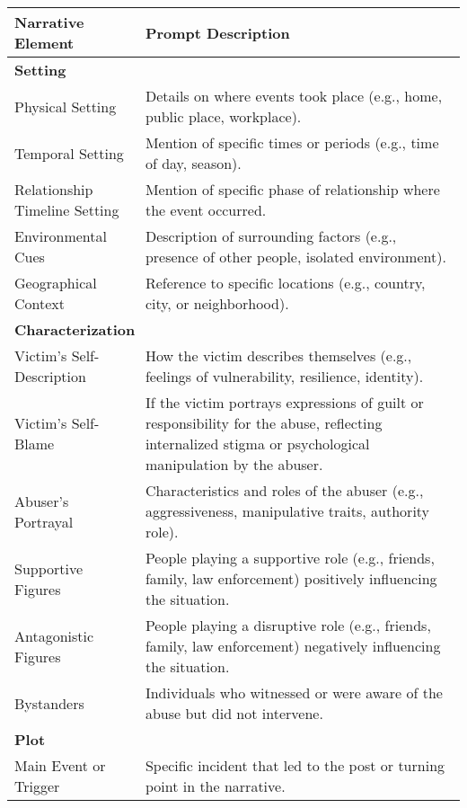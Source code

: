 \documentclass[11pt]{article}
\begin{document}
\begin{table}[ht]
    \centering
    \begin{tabular}{|p{4cm}|p{12cm}|}
        \hline
        \textbf{Narrative Element} & \textbf{Prompt Description} \\ \hline
        \multicolumn{2}{|l|}{\textbf{Setting}} \\ \hline
        Physical Setting & Details on where events took place (e.g., home, public place, workplace). \\ \hline
        Temporal Setting & Mention of specific times or periods (e.g., time of day, season). \\ \hline
        Relationship Timeline Setting & Mention of specific phase of relationship where the event occurred. \\ \hline
        Environmental Cues & Description of surrounding factors (e.g., presence of other people, isolated environment). \\ \hline
        Geographical Context & Reference to specific locations (e.g., country, city, or neighborhood). \\ \hline
        \multicolumn{2}{|l|}{\textbf{Characterization}} \\ \hline
        Victim's Self-Description & How the victim describes themselves (e.g., feelings of vulnerability, resilience, identity). \\ \hline
        Victim's Self-Blame & If the victim portrays expressions of guilt or responsibility for the abuse, reflecting internalized stigma or psychological manipulation by the abuser. \\ \hline
        Abuser's Portrayal & Characteristics and roles of the abuser (e.g., aggressiveness, manipulative traits, authority role). \\ \hline
        Supportive Figures & People playing a supportive role (e.g., friends, family, law enforcement) positively influencing the situation. \\ \hline
        Antagonistic Figures & People playing a disruptive role (e.g., friends, family, law enforcement) negatively influencing the situation. \\ \hline
        Bystanders & Individuals who witnessed or were aware of the abuse but did not intervene. \\ \hline
        \multicolumn{2}{|l|}{\textbf{Plot}} \\ \hline
        Main Event or Trigger & Specific incident that led to the post or turning point in the narrative. \\ \hline

\end{tabular}
\end{table}
\end{document}
